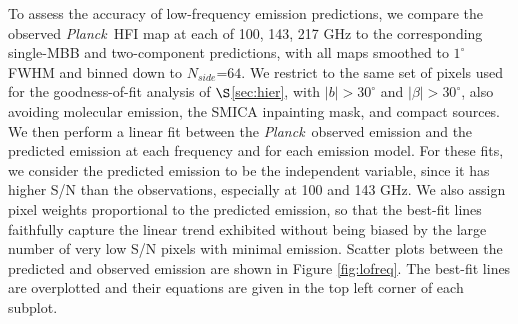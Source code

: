 \documentclass{emulateapj}
\newcommand{\PLANCK}{{\it Planck}}
\begin{document}
\begin{figure*}
\begin{center}
\caption{\label{fig:lofreq} Comparison between low-frequency thermal dust 
emission predictions from our best-fit two-component model (Table 
\ref{tab:global}, model 2) and those of \cite{planckdust}. The top row shows
scatter plots of the \cite{planckdust} predictions versus observed \PLANCK~100 
GHz (left), \PLANCK~143 GHz (center) and \PLANCK~217 GHz (right). The bottom 
row shows scatter plots of the corresponding two-component predictions versus
\PLANCK~observations. In all cases, the blue line indicates the best-fit linear
relationship, while the red line represents a perfect match between predictions
and observations. The lines of best-fit illustrate that the single-MBB model 
systematically underpredicts emission (in the multiplicative sense) by 18.8\%, 
12.6\% and 7.9\% at 100, 143 and 217 GHz respectively. On the other hand, by 
the same metric, the two-component model predictions at 100-217 GHz are always 
accurate to within $\le$2.2\%. The two-component fit results shown are based on
217-3000 GHz observations, meaning that the 100 GHz and 143 GHz predictions are
truly extrapolations, while the 217 GHz agreement is enforced by the fitting 
process itself to some extent.}
\end{center}
\end{figure*}

To assess the accuracy of low-frequency emission predictions, we compare the 
observed \PLANCK~HFI map at each of 100, 143, 217 GHz to the corresponding 
single-MBB and two-component predictions, with all maps smoothed to $1^{\circ}$
FWHM and binned down to $N_{side}$=$64$. We restrict to the same set of pixels 
used for the goodness-of-fit analysis of $\S$\ref{sec:hier}, with 
$|b|>30^{\circ}$ and $|\beta|>30^{\circ}$, also avoiding molecular emission, 
the SMICA inpainting mask, and compact sources. We then perform a linear fit 
between the \PLANCK~observed emission and the predicted emission at each 
frequency and for each emission model. For these fits, we consider the 
predicted emission to be the independent variable, since it has higher S/N than
the observations, especially at 100 and 143 GHz. We also assign pixel weights 
proportional to the predicted emission, so that the best-fit lines faithfully 
capture the linear trend exhibited without being biased by the large number of 
very low S/N pixels with minimal emission. Scatter plots between the predicted 
and observed emission are shown in Figure \ref{fig:lofreq}. The best-fit lines 
are overplotted and their equations are given in the top left corner of each 
subplot.
\end{document}
